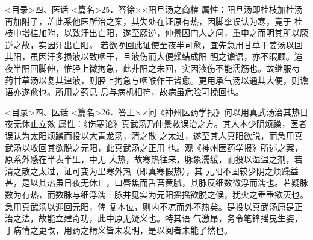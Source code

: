\documentclass[a4paper,12pt,UTF8,twoside]{ctexbook}
\begin{document}
<目录>四、医话
<篇名>25．答徐××阳旦汤之商榷
属性：阳旦汤即桂枝加桂汤再加附子，盖此系他医所治之案，其失处在证原有热，因脚挛误认为寒，竟于 
桂枝中增桂加附，以致汗出亡阳，遂至厥逆，仲景因门人之问，重申之而明其所以厥逆之故，实因汗出亡阳。 
若欲挽回此证使至夜半可愈，宜先急用甘草干姜汤以回其阳，虽因汗多损液以致咽干，且液伤而大便燥结成阳 
明之谵语，亦不暇顾。迨夜半阳回脚伸，惟胫上微拘急，此非阳之未回，实因液伤不能濡筋也。故继服芍 
药甘草汤以复其津液，则胫上拘急与咽喉作干皆愈。更用承气汤以通其大便，则谵语亦遂愈也。所用之药息 
息与病机相符，故病虽危险可挽回也。 

<目录>四、医话
<篇名>26．答王××问《神州医药学报》何以用真武汤治其热日夜无休止立效
属性：《伤寒论》真武汤乃仲景救误治之方。其人本少阴烦躁，医者误认为太阳烦躁而投以大青龙汤，清之散 
之太过，遂至其人真阳欲脱，而急用真武汤以收回其欲脱之元阳，此真武汤之正用 
也。观《神州医药学报》所述之案，原系外感在半表半里，中无 
大热，故寒热往来，脉象濡缓，而投以湿温之剂，若清之散之太过，证可变为里寒外热（即真寒假热），其 
元阳不固较少阴之烦躁益甚，是以其热虽日夜无休止，口唇焦而舌苔黄腻，其脉反细数微浮而濡也。若疑脉 
数为有热，而数脉与细浮濡三脉并见实为元阳摇摇欲脱之候，犹火之垂垂欲灭也。急用真武汤以迎回元阳，俾 
复本位，则内不凉而外不热矣。是投以真武汤原是正治之法，故能立建奇功，此中原无疑义也。特其语 
气激昂，务令笔锋摇曳生姿，于病情之更改，用药之精义皆未发明，是以阅者未能了然也。 
\end{document}
